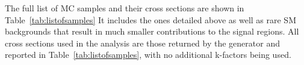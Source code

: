 
The full list of MC samples and their cross sections are shown in Table~\ref{tab:listofsamples}
It includes the ones detailed above as well as rare SM backgrounds that result in much smaller contributions to the signal regions.
All cross sections used in the analysis are those returned by the generator and reported in Table~\ref{tab:listofsamples}, with no additional k-factors being used.

